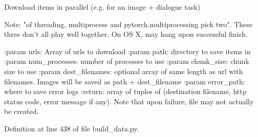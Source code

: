 \begin{DoxyVerb}Download items in parallel (e.g. for an image + dialogue task)

Note: "of threading, multiprocess and pytorch.multiprocessing pick two".
These three don't all play well together. On OS X, may hang upon successful finish.

:param urls: Array of urls to download
:param path: directory to save items in
:param num_processes: number of processes to use
:param chunk_size: chunk size to use
:param dest_filenames: optional array of same length as url with filenames.
 Images will be saved as path + dest_filename
:param error_path: where to save error logs
:return: array of tuples of (destination filename, http status code, error
message if any). Note that upon failure, file may not actually be created.
\end{DoxyVerb}
 

Definition at line 438 of file build\+\_\+data.\+py.


